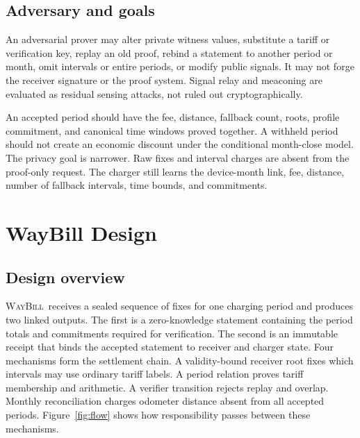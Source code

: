 \documentclass[conference]{IEEEtran}
\theoremstyle{plain}
\theoremstyle{definition}
\newcommand{\system}{\textsc{WayBill}}
\begin{document}
\subsection{Adversary and goals}

An adversarial prover may alter private witness values, substitute a tariff or
verification key, replay an old proof, rebind a statement to another period or
month, omit intervals or entire periods, or modify public signals. It may not
forge the receiver signature or the proof system. Signal relay and meaconing
are evaluated as residual sensing attacks, not ruled out cryptographically.

An accepted period should have the fee, distance, fallback count, roots,
profile commitment, and canonical time windows proved together. A withheld
period should not create an economic discount under the conditional month-close
model. The privacy goal is narrower. Raw fixes and interval charges are absent
from the proof-only request. The charger still learns the device-month link,
fee, distance, number of fallback intervals, time bounds, and commitments.

\section{WayBill Design}

\subsection{Design overview}

\system\ receives a sealed sequence of fixes for one charging period and
produces two linked outputs. The first is a zero-knowledge statement containing
the period totals and commitments required for verification. The second is an
immutable receipt that binds the accepted statement to receiver and charger
state. Four mechanisms form the settlement chain. A validity-bound receiver
root fixes which intervals may use ordinary tariff labels. A period relation
proves tariff membership and arithmetic. A verifier transition rejects replay
and overlap. Monthly reconciliation charges odometer distance absent from all
accepted periods. Figure~\ref{fig:flow} shows how responsibility passes between
these mechanisms.
\end{document}
